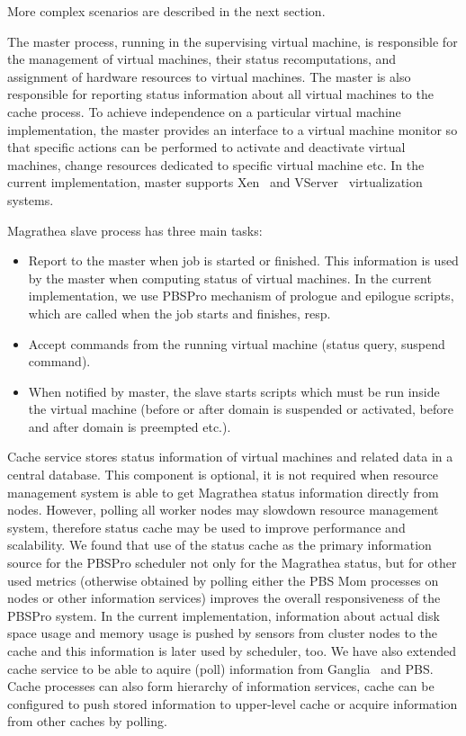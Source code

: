 \documentclass{sig-alternate}
\begin{document}
More complex scenarios are described in the next section.

The master process, running in the supervising virtual machine, 
is responsible for the 
management of virtual machines, their status recomputations,
and assignment of hardware resources to virtual machines.
The master is also responsible for
reporting status information about all virtual machines to the cache
process. To achieve independence on a
particular virtual machine implementation, the master provides an interface to a virtual machine monitor 
so that specific actions can be performed to activate and deactivate virtual machines, change resources 
dedicated to specific virtual machine etc. In the current implementation,
master supports Xen~\cite{xen} and VServer~\cite{vserver} virtualization
systems.

Magrathea slave process has three main tasks:
\begin{itemize}
\item Report to the master when job is started or finished. This information is used by the master
when computing status of virtual machines. In the current implementation,
we use PBSPro mechanism of
prologue and epilogue scripts, which are called when the job
starts and finishes, resp.
\item Accept commands from the running virtual machine (status query, suspend command).
\item When notified by master, the slave starts scripts which must be run
inside the virtual machine
(before or after domain is suspended or activated, before and after domain is preempted etc.).
\end{itemize}

Cache service stores status information of virtual machines and related data in a central database. This 
component is optional, it is not required when resource management system is able to get Magrathea status 
information
directly from nodes. However, polling all worker nodes may slowdown resource management system, therefore
status cache may be used to improve performance and scalability.
We found that use of the status cache as the primary information source
for the PBSPro scheduler not only for the Magrathea status, but for other
used metrics (otherwise obtained by polling either the PBS Mom processes on nodes
or other information services) improves the overall responsiveness of the
PBSPro system. In the current implementation, 
information about actual disk space usage and memory usage is pushed by sensors from cluster nodes to the
cache and this information is later used by scheduler, too. We have also extended cache service to be able
to aquire (poll) information from Ganglia~\cite{ganglia} and PBS. Cache processes can also form hierarchy
of information services, cache can be configured to push stored information to upper-level cache or acquire
information from other caches by polling.
\end{document}

